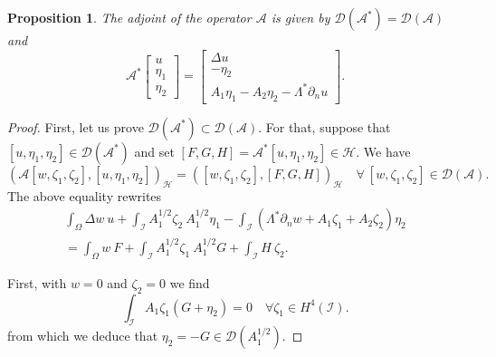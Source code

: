 \documentclass[a4paper, 12pt]{article}
\theoremstyle{plain}
\newtheorem{proposition}[theorem]{Proposition}
\theoremstyle{definition}
\numberwithin{theorem}{section}
\numberwithin{equation}{section}
\begin{document}
{\begin{proposition} 
    The adjoint of the operator $\mathcal{A}$ is given by $\mathcal{D}(\mathcal{A}^*)=\mathcal{D}(\mathcal{A})$ and 
    \begin{equation}\label{non-b-op-adj}
\mathcal{A}^*\begin{bmatrix}
u\\
\eta_1\\
\eta_2
\end{bmatrix}=\begin{bmatrix}
  \Delta u\\
  -\eta_2\\
  A_1\eta_1-A_2\eta_2-\Lambda^*\partial_n u
\end{bmatrix}.
\end{equation}
\end{proposition}
\begin{proof}
First, let us prove $\mathcal{D}(\mathcal{A}^*)\subset \mathcal{D}(\mathcal{A})$. For that, suppose that $[u,\eta_1,\eta_2]\in \mathcal{D}(\mathcal{A}^*)$ and set $[F,G,H]=\mathcal{A}^*[u,\eta_1,\eta_2]\in \mathscr{H}$. We have
$$\left(\mathcal{A}[w,\zeta_1,\zeta_2],[u,\eta_1,\eta_2]\right)_{\mathscr{H}}=\left([w,\zeta_1,\zeta_2], [F,G,H]\right)_{\mathscr{H}}\quad \forall ~[w,\zeta_1,\zeta_2]\in \mathcal{D}(\mathcal{A}).$$
The above equality rewrites
\begin{multline}\label{Eq1proofAstar}
\int_\Omega\Delta w~u+\int_{\mathcal{I}}A_1^{1/2} \zeta_2 ~ A_1^{1/2}\eta_1-\int_{\mathcal{I}}(\Lambda^*\partial_n w+A_1\zeta_1+A_2\zeta_2)\eta_2\\
=\int_\Omega w~F+\int_{\mathcal{I}} A_1^{1/2}\zeta_1~ A_1^{1/2} G + \int_{\mathcal{I}}H~\zeta_2.
\end{multline}

First, with $w=0$ and $\zeta_2=0$ we find
$$\int_{\mathcal{I}}A_1 \zeta_1(G+\eta_2)=0 \quad\forall \zeta_1\in H^4(\mathcal{I}).$$ 
from which we deduce that $\eta_2=-G\in \mathcal{D}(A_1^{1/2})$. 


\end{proof}}
\end{document}
